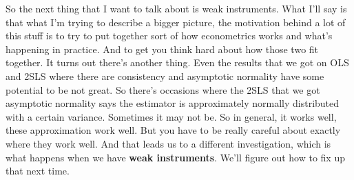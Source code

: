 \documentclass[11pt,a4paper]{amsart}
\theoremstyle{plain}
\theoremstyle{definition}
\begin{document}
				 So the next thing that I want to talk about is weak instruments.  What I'll say is that what I'm trying to describe a bigger picture, the motivation behind a lot of this stuff is to try to put together sort of how econometrics works and what's happening in practice. And to get you think hard about how those two fit together. It turns out there's another thing. Even the results that we got on OLS and 2SLS where there are consistency and asymptotic normality have some potential to be not great.  So there's occasions where the 2SLS that we got asymptotic normality says the estimator is approximately normally distributed with a certain variance. Sometimes it may not be. So in general, it works well, these approximation work well. But you have to be really careful about exactly where they work well. And that leads us to a different investigation, which is what happens when we have \textbf{weak instruments}. We'll figure out how to fix up that next time.
\end{document}
